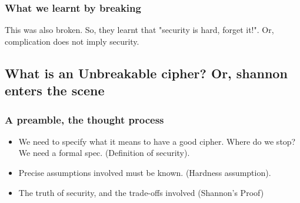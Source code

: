 \subsubsection{What we learnt by breaking}
This was also broken. So, they learnt that "security is hard, forget it!".
Or, complication does not imply security.


\subsection{What is an Unbreakable cipher? Or, shannon enters the scene}
\subsubsection{A preamble, the thought process}
\begin{itemize}
    \item We need to specify what it means to have a good cipher. Where do
        we stop? We need a formal spec. (Definition of security).
    \item Precise assumptions involved must be known. (Hardness assumption).
    \item The truth of security, and the trade-offs involved (Shannon's Proof)
\end{itemize}
